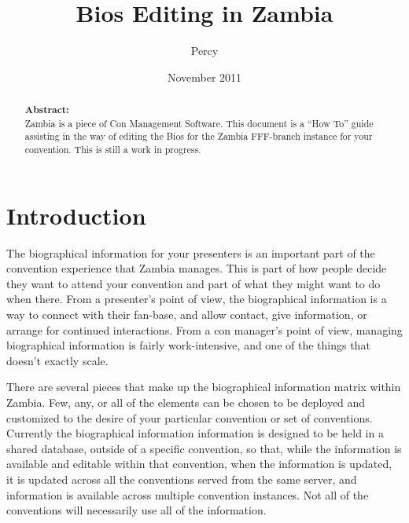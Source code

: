 \documentclass[tablesignature]{scrartcl}
\title{Bios Editing in Zambia}
\author{Percy}
\date{November 2011}
\begin{document}
\maketitle


\thispagestyle{fancy}
\renewcommand{\headrulewidth}{0pt}
\renewcommand{\footrulewidth}{1pt}
\lhead{}
\rhead{}
\chead{}
\cfoot{}
\rfoot{\thepage}
\begin{abstract}
\vspace{5cm}
{\LARGE{\textbf{Abstract:\\}}}
Zambia is a piece of Con Management Software.  This document is a ``How To'' guide assisting in the way of editing the Bios for the Zambia FFF-branch instance for your convention.  This is still a work in progress.
\end{abstract}
\newpage
\renewcommand{\headrulewidth}{1pt}
\tableofcontents
\listoftables
\listoffigures
\newpage
{}
\section{Introduction}
\label{sec-1}


  The biographical information for your presenters is an important
  part of the convention experience that Zambia manages.  This is part
  of how people decide they want to attend your convention and part of
  what they might want to do when there.  From a presenter's point of
  view, the biographical information is a way to connect with their
  fan-base, and allow contact, give information, or arrange for
  continued interactions.  From a con manager's point of view,
  managing biographical information is fairly work-intensive, and one
  of the things that doesn't exactly scale.

  There are several pieces that make up the biographical information
  matrix within Zambia.  Few, any, or all of the elements can be
  chosen to be deployed and customized to the desire of your
  particular convention or set of conventions.  Currently the
  biographical information information is designed to be held in a
  shared database, outside of a specific convention, so that, while
  the information is available and editable within that convention,
  when the information is updated, it is updated across all the
  conventions served from the same server, and information is
  available across multiple convention instances.  Not all of the
  conventions will necessarily use all of the information.
\end{document}
